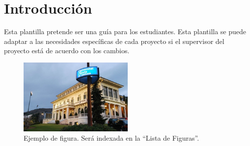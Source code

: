 \documentclass[12pt,a4paper,twoside]{book}
\begin{document}
\setcounter{section}{0} %
\renewcommand{\thesection}{\arabic{section}} %


\newpage

\newpage

\pagestyle{fancy}
\renewcommand{\chaptermark}[1]{ \markboth{#1}{}}
\renewcommand{\sectionmark}[1]{\markright{ \thesection.\ #1}}
\lhead[\fancyplain{}{\bfseries\thepage}]{\fancyplain{}{\bfseries\rightmark}}
\rhead[\fancyplain{}{\bfseries\leftmark}]{\fancyplain{}{\bfseries\thepage}}
\cfoot{}

\cleardoublepage
{}
{}
\tableofcontents
\cleardoublepage
{}
{}
\listoffigures
\cleardoublepage
{}
{}
\listoftables

\thispagestyle{empty}


\pagestyle{fancy}
\renewcommand{\chaptermark}[1]{ \markboth{#1}{}}
\renewcommand{\sectionmark}[1]{\markright{ \thesection.\ #1}}
\lhead[\fancyplain{}{\bfseries\thepage}]{\fancyplain{}{\bfseries\rightmark}}
\rhead[\fancyplain{}{\bfseries\leftmark}]{\fancyplain{}{\bfseries\thepage}}
\cfoot{}

\onehalfspacing

\section{Introducción}

Esta plantilla pretende ser una guía para los estudiantes. Esta plantilla se puede adaptar a las necesidades específicas de cada proyecto si el supervisor del proyecto está de acuerdo con los cambios.

\begin{figure}[h]
\centering
\includegraphics[width=0.5\textwidth]{./figs/image1.png}
\caption{Ejemplo de figura. Será indexada en la “Lista de Figuras”.}
\label{fig:figura_ejemplo}
\end{figure}
\end{document}
